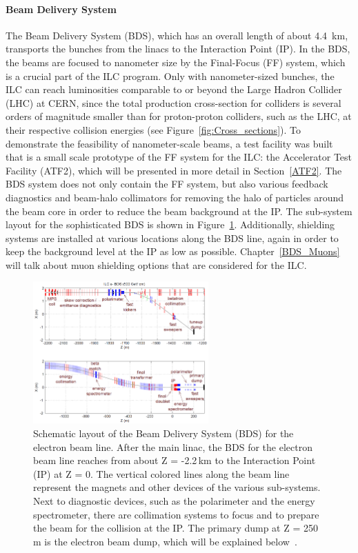 \paragraph{Beam Delivery System}
The Beam Delivery System (BDS), which has an overall length of about \SI{4.4}{\kilo\meter}, transports the bunches from the linacs to the Interaction Point (IP).
In the BDS, the beams are focused to nanometer size by the Final-Focus (FF) system, which is a crucial part of the ILC program.
Only with nanometer-sized bunches, the ILC can reach luminosities comparable to or beyond the Large Hadron Collider (LHC) at CERN, since the total production cross-section for \positron \electron colliders is several orders of magnitude smaller than for proton-proton colliders, such as the LHC, at their respective collision energies (see Figure~\ref{fig:Cross_sections}).
To demonstrate the feasibility of nanometer-scale beams, a test facility was built that is a small scale prototype of the FF system for the ILC: the Accelerator Test Facility (ATF2), which will be presented in more detail in Section~\ref{ATF2}.
The BDS system does not only contain the FF system, but also various feedback diagnostics and beam-halo collimators for removing the halo of particles around the beam core in order to reduce the beam background at the IP. 
The sub-system layout for the sophisticated  BDS is shown in Figure~\ref{fig:BDS}.
Additionally, shielding systems are installed at various locations along the BDS line, again in order to keep the background level at the IP as low as possible.
Chapter~\ref{BDS_Muons} will talk about muon shielding options that are considered for the ILC.
\begin{figure}[h]
\centering
\includegraphics[width=0.6\textwidth]{Figures/BDS.png}
\caption[Layout of the Beam Delivery System]{Schematic layout of the Beam Delivery System (BDS) for the electron beam line.
After the main linac, the BDS for the electron beam line reaches from about Z = -2.2\,km to the Interaction Point (IP) at Z = 0.
The vertical colored lines along the beam line represent the magnets and other devices of the various sub-systems.
Next to diagnostic devices, such as the polarimeter and the energy spectrometer, there are collimation systems to focus and to prepare the beam for the collision at the IP.
The primary dump at Z = 250\,m is the electron beam dump, which will be explained below~\cite[p. 135]{TDR32}.}
\label{fig:BDS}
\end{figure}

